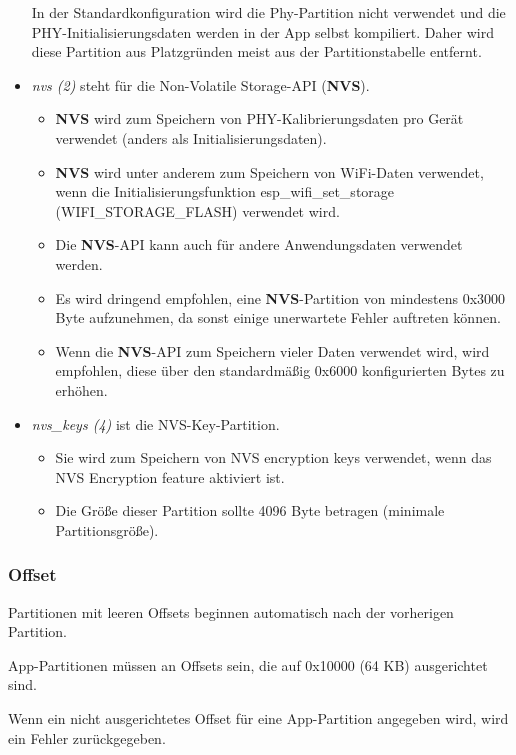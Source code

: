 \begin{itemize}
    In der Standardkonfiguration wird die Phy-Partition nicht verwendet und die PHY-Initialisierungsdaten werden in der App selbst kompiliert. Daher wird diese Partition aus Platzgründen meist aus der Partitionstabelle entfernt.
    \item \textit{nvs (2)} steht für die Non-Volatile Storage-API (\textbf{NVS}).
    \begin{itemize}
        \item \textbf{NVS} wird zum Speichern von PHY-Kalibrierungsdaten pro Gerät verwendet (anders als Initialisierungsdaten).
        \item \textbf{NVS} wird unter anderem zum Speichern von WiFi-Daten verwendet, wenn die Initialisierungsfunktion esp\_wifi\_set\_storage (WIFI\_STORAGE\_FLASH) verwendet wird.
        \item Die \textbf{NVS}-API kann auch für andere Anwendungsdaten verwendet werden.
        \item Es wird dringend empfohlen, eine \textbf{NVS}-Partition von mindestens 0x3000 Byte aufzunehmen, da sonst einige unerwartete Fehler auftreten können.
        \item Wenn die \textbf{NVS}-API zum Speichern vieler Daten verwendet wird, wird empfohlen, diese über den standardmäßig 0x6000 konfigurierten Bytes zu erhöhen.
    \end{itemize}
    \item \textit{nvs\_keys (4)} ist die \textmd{NVS}-Key-Partition.
    \begin{itemize}
        \item Sie wird zum Speichern von \textmd{NVS} encryption keys verwendet, wenn das \textmd{NVS} Encryption feature aktiviert ist.
        \item Die Größe dieser Partition sollte 4096 Byte betragen (minimale Partitionsgröße).
    \end{itemize}
\end{itemize}

\subsubsection{Offset}
Partitionen mit leeren Offsets beginnen automatisch nach der vorherigen Partition. 

App-Partitionen müssen an Offsets sein, die auf 0x10000 (64 KB) ausgerichtet sind.

Wenn ein nicht ausgerichtetes Offset für eine App-Partition angegeben wird, wird ein Fehler zurückgegeben.

